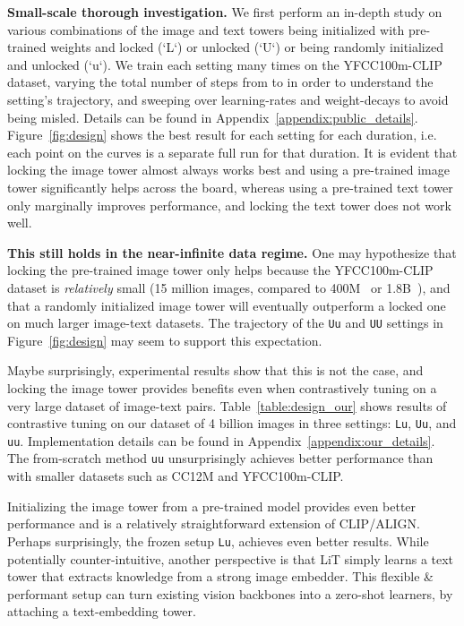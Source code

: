 \documentclass[10pt,twocolumn,letterpaper]{article}
\makeatletter
\def \lit {LiT\xspace}
\def \Lu {{\tt Lu}\xspace}
\def \Uu {{\tt Uu}\xspace}
\def \UU {{\tt UU}\xspace}
\def \uu {{\tt uu}\xspace}
\renewcommand*{\ie}{i.e.\@\xspace}
\makeatother
\begin{document}
\textbf{Small-scale thorough investigation.} We first perform an in-depth study on various combinations of the image and text towers being initialized with pre-trained weights and locked (`L`) or unlocked (`U`) or being randomly initialized and unlocked (`u`).
We train each setting many times on the YFCC100m-CLIP dataset, varying the total number of steps from  to  in order to understand the setting's trajectory, and sweeping over learning-rates and weight-decays to avoid being misled.
Details can be found in Appendix~\ref{appendix:public_details}.
Figure~\ref{fig:design} shows the best result for each setting for each duration, \ie each point on the curves is a separate full run for that duration.
It is evident that locking the image tower almost always works best and using a pre-trained image tower significantly helps across the board, whereas using a pre-trained text tower only marginally improves performance, and locking the text tower does not work well.

\textbf{This still holds in the near-infinite data regime.} One may hypothesize that locking the pre-trained image tower only helps because the YFCC100m-CLIP dataset is \emph{relatively} small (15 million images, compared to 400M~\cite{clip} or 1.8B~\cite{align}), and that a randomly initialized image tower will eventually outperform a locked one on much larger image-text datasets.
The trajectory of the \Uu and \UU settings in Figure~\ref{fig:design} may seem to support this expectation.

Maybe surprisingly, 
experimental results
show that this is not the case, and locking the image tower provides benefits even when contrastively tuning on a very large dataset of image-text pairs.
Table~\ref{table:design_our} shows results of contrastive tuning on our dataset of 4 billion images in three settings: \Lu, \Uu, and \uu.
Implementation details can be found in Appendix~\ref{appendix:our_details}.
The from-scratch method \uu unsurprisingly achieves better performance than with smaller datasets such as CC12M and YFCC100m-CLIP. 

Initializing the image tower from a pre-trained model provides even better performance and is a relatively straightforward extension of CLIP/ALIGN.
Perhaps surprisingly, the frozen setup \Lu, achieves even better results. 
While potentially counter-intuitive, another perspective is that \lit simply learns a text tower that extracts knowledge from a strong image embedder. 
This flexible \& performant setup can turn existing vision backbones into a zero-shot learners, by attaching a text-embedding tower.
\end{document}
